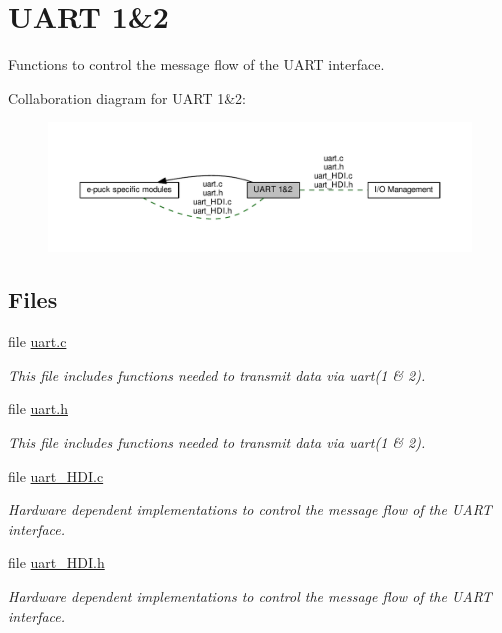\hypertarget{group__uart}{}\section{U\+A\+R\+T 1\&2}
\label{group__uart}


Functions to control the message flow of the U\+A\+R\+T interface.  


Collaboration diagram for U\+A\+R\+T 1\&2\+:\nopagebreak
\begin{figure}[H]
\begin{center}
\leavevmode
\includegraphics[width=350pt]{db/def/group__uart}
\end{center}
\end{figure}
\subsection*{Files}
\begin{DoxyCompactItemize}
\item 
file \hyperlink{uart_8c}{uart.\+c}
\begin{DoxyCompactList}\small\item\em This file includes functions needed to transmit data via uart(1 \& 2). \end{DoxyCompactList}\item 
file \hyperlink{uart_8h}{uart.\+h}
\begin{DoxyCompactList}\small\item\em This file includes functions needed to transmit data via uart(1 \& 2). \end{DoxyCompactList}\item 
file \hyperlink{uart__HDI_8c}{uart\+\_\+\+H\+D\+I.\+c}
\begin{DoxyCompactList}\small\item\em Hardware dependent implementations to control the message flow of the U\+A\+R\+T interface. \end{DoxyCompactList}\item 
file \hyperlink{uart__HDI_8h}{uart\+\_\+\+H\+D\+I.\+h}
\begin{DoxyCompactList}\small\item\em Hardware dependent implementations to control the message flow of the U\+A\+R\+T interface. \end{DoxyCompactList}\end{DoxyCompactItemize}


